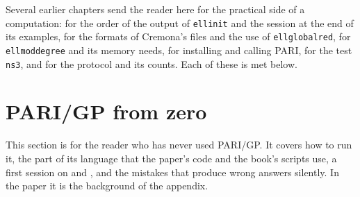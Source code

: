 \begin{sloppypar}
Several earlier chapters send the reader here for the practical side of a computation:  for the order of the output of
\texttt{ellinit} and the session at the end of its examples,  for the formats of Cremona's files and the use of
\texttt{ellglobalred},  for \texttt{ellmoddegree} and its memory needs,  for installing and
calling PARI,  for the test \texttt{ns3}, and  for the protocol and its counts. Each of these is met below.

\section{PARI/GP from zero}\label{sec:computation:pari}

This section is for the reader who has never used PARI/GP. It covers how to run it, the part of its language that the paper's code and
the book's scripts use, a first session on  and , and the mistakes that produce wrong answers silently. In the paper
it is the background of the appendix.


\end{sloppypar}
